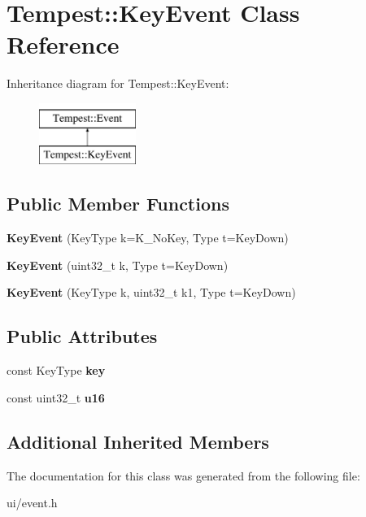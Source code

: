 \hypertarget{class_tempest_1_1_key_event}{\section{Tempest\+:\+:Key\+Event Class Reference}
\label{class_tempest_1_1_key_event}
}
Inheritance diagram for Tempest\+:\+:Key\+Event\+:\begin{figure}[H]
\begin{center}
\leavevmode
\includegraphics[height=2.000000cm]{class_tempest_1_1_key_event}
\end{center}
\end{figure}
\subsection*{Public Member Functions}
\begin{DoxyCompactItemize}
\item 
\hypertarget{class_tempest_1_1_key_event_ade6677a2c594a7f072ccde341db49cb3}{{\bfseries Key\+Event} (Key\+Type k=K\+\_\+\+No\+Key, Type t=Key\+Down)}\label{class_tempest_1_1_key_event_ade6677a2c594a7f072ccde341db49cb3}

\item 
\hypertarget{class_tempest_1_1_key_event_a8292b354fa498765ccb9189ddbdd9fa1}{{\bfseries Key\+Event} (uint32\+\_\+t k, Type t=Key\+Down)}\label{class_tempest_1_1_key_event_a8292b354fa498765ccb9189ddbdd9fa1}

\item 
\hypertarget{class_tempest_1_1_key_event_a5770f060d4356d820af6f2cb4519905c}{{\bfseries Key\+Event} (Key\+Type k, uint32\+\_\+t k1, Type t=Key\+Down)}\label{class_tempest_1_1_key_event_a5770f060d4356d820af6f2cb4519905c}

\end{DoxyCompactItemize}
\subsection*{Public Attributes}
\begin{DoxyCompactItemize}
\item 
\hypertarget{class_tempest_1_1_key_event_a21fd3762fe4fbe2e6037acedb6ffce4e}{const Key\+Type {\bfseries key}}\label{class_tempest_1_1_key_event_a21fd3762fe4fbe2e6037acedb6ffce4e}

\item 
\hypertarget{class_tempest_1_1_key_event_a68c481e24208dad79104563df95485aa}{const uint32\+\_\+t {\bfseries u16}}\label{class_tempest_1_1_key_event_a68c481e24208dad79104563df95485aa}

\end{DoxyCompactItemize}
\subsection*{Additional Inherited Members}


The documentation for this class was generated from the following file\+:\begin{DoxyCompactItemize}
\item 
ui/event.\+h\end{DoxyCompactItemize}
